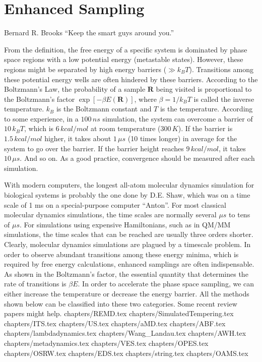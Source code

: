 \chapter{Enhanced Sampling\label{chapter:ES}}
\begin{chapquote}{Bernard R. Brooks%
	}
	``Keep the smart guys around you.''
\end{chapquote}
From the definition, the free energy of a specific system is dominated by phase space regions with a low potential energy (metastable states). However, these regions might be separated by high energy barriers ($\gg k_BT$). Transitions among these potential energy wells are often hindered by these barriers. According to the Boltzmann's Law, the probability of a sample $\mathbf{R}$ being visited is proportional to the Boltzmann's factor $\exp{\left[-\beta E(\mathbf{R})\right]}$, where $\beta=1/k_BT$ is called the inverse temperature. $k_B$ is the Boltzmann constant and $T$ is the temperature. According to some experience, in a $100\, ns$ simulation, the system can overcome a barrier of $10\, k_BT$, which is $6\, kcal/mol$ at room temperature ($300\, K$). If the barrier is $1.5\, kcal/mol$ higher, it takes about $1\, \mu s$ (10 times longer) in average for the system to go over the barrier. If the barrier height reaches $9\, kcal/mol$, it takes $10\,\mu s$. And so on. As a good practice, convergence should be measured after each simulation.\cite{GrossfieldLJCMS2018}

With modern computers, the longest all-atom molecular dynamics simulation for biological systems is probably the one done by D.E. Shaw, which was on a time scale of 1 ms on a special-purpose computer ``Anton''. For most classical molecular dynamics simulations, the time scales are normally several $\mu s$ to tens of $\mu s$. For simulations using expensive Hamiltonians, such as in QM/MM simulations, the time scales that can be reached are usually three orders shorter. Clearly, molecular dynamics simulations are plagued by a timescale problem. In order to observe abundant transitions among these energy minima, which is required by free energy calculations, enhanced samplings are often indispensable. As shown in the Boltzmann's factor, the essential quantity that determines the rate of transitions is $\beta E$. In order to accelerate the phase space sampling, we can either increase the temperature or decrease the energy barrier. All the methods shown below can be classified into these two categories. Some recent review papers might help.\cite{ZuckermanARB2011,BernardiBBA2015,KamenikPCCP2022,ChenCOSB2022}
\clearpage 
 {chapters/REMD.tex}
\clearpage
 {chapters/SimulatedTempering.tex}
\clearpage
 {chapters/ITS.tex}
\clearpage
 {chapters/US.tex}
\clearpage
 {chapters/aMD.tex}
\clearpage
 {chapters/ABF.tex}
\clearpage 
 {chapters/lambdadynamics.tex}
\clearpage 
 {chapters/Wang_Landau.tex}
\clearpage 
 {chapters/AWH.tex}
\clearpage
 {chapters/metadynamics.tex}
\clearpage 
 {chapters/VES.tex}
\clearpage 
 {chapters/OPES.tex}
\clearpage 
 {chapters/OSRW.tex}
\clearpage
 {chapters/EDS.tex}
%
\clearpage
 {chapters/string.tex}
\clearpage
 {chapters/OAMS.tex}

